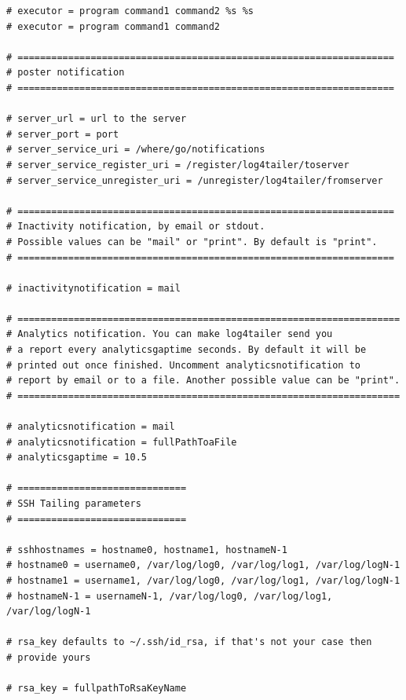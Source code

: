 \begin{verbatim}
# executor = program command1 command2 %s %s
# executor = program command1 command2 

# ===================================================================
# poster notification
# ===================================================================

# server_url = url to the server
# server_port = port
# server_service_uri = /where/go/notifications
# server_service_register_uri = /register/log4tailer/toserver
# server_service_unregister_uri = /unregister/log4tailer/fromserver

# ===================================================================
# Inactivity notification, by email or stdout.
# Possible values can be "mail" or "print". By default is "print".
# ===================================================================

# inactivitynotification = mail

# ====================================================================
# Analytics notification. You can make log4tailer send you 
# a report every analyticsgaptime seconds. By default it will be 
# printed out once finished. Uncomment analyticsnotification to 
# report by email or to a file. Another possible value can be "print".
# ====================================================================

# analyticsnotification = mail
# analyticsnotification = fullPathToaFile
# analyticsgaptime = 10.5

# ==============================
# SSH Tailing parameters
# ==============================

# sshhostnames = hostname0, hostname1, hostnameN-1
# hostname0 = username0, /var/log/log0, /var/log/log1, /var/log/logN-1
# hostname1 = username1, /var/log/log0, /var/log/log1, /var/log/logN-1
# hostnameN-1 = usernameN-1, /var/log/log0, /var/log/log1, /var/log/logN-1

# rsa_key defaults to ~/.ssh/id_rsa, if that's not your case then 
# provide yours

# rsa_key = fullpathToRsaKeyName 

\end{verbatim}

\newpage
